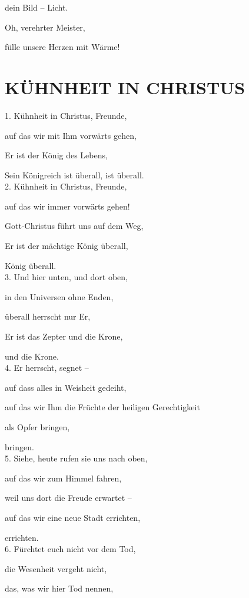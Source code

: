 \documentclass[11pt,a5paper,twoside]{article}
\begin{document}
dein Bild -- Licht. 

Oh, verehrter Meister,

fülle unsere Herzen mit Wärme!

\section[Kühnheit in Christus]{KÜHNHEIT IN CHRISTUS}

1. Kühnheit in Christus, Freunde, 

auf das wir mit Ihm vorwärts gehen,

Er ist der König des Lebens, 

Sein Königreich ist überall, ist überall.\\

2. Kühnheit in Christus, Freunde,
 
auf das wir immer vorwärts gehen!

Gott-Christus führt uns auf dem Weg,

Er ist der mächtige König überall,

König überall.\\

3. Und hier unten, und dort oben,

in den Universen ohne Enden,

überall herrscht nur Er,

Er ist das Zepter und die Krone,

und die Krone.\\

4. Er herrscht, segnet --

auf dass alles in Weisheit gedeiht,

auf das wir Ihm die Früchte der heiligen Gerechtigkeit

als Opfer bringen,

bringen.\\

5. Siehe, heute rufen sie uns nach oben,

auf das wir zum Himmel fahren,

weil uns dort die Freude erwartet -- 

auf das wir eine neue Stadt errichten,

errichten.\\

6. Fürchtet euch nicht vor dem Tod,

die Wesenheit vergeht nicht,

das, was wir hier Tod nennen,
\end{document}
